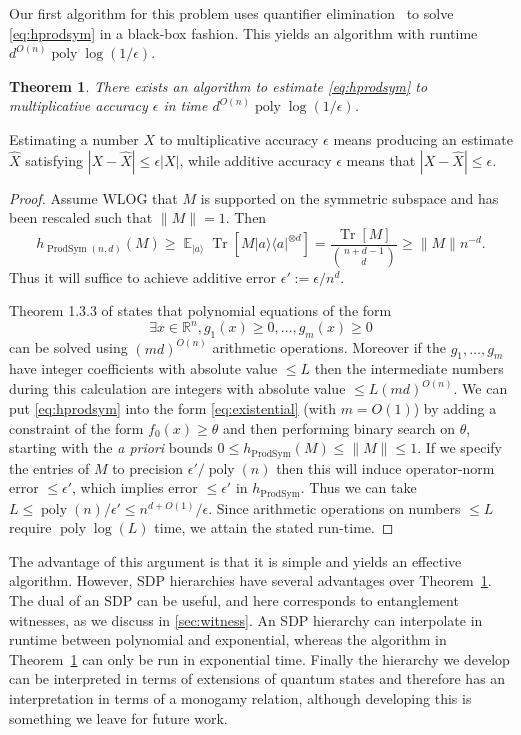 \documentclass[aps,pra,notitlepage,preprintnumbers,11pt,tightenlines]{revtex4-1}
\newcommand{\bra}[1]{\langle #1 |}
\newcommand{\ket}[1]{| #1 \rangle}
\newcommand{\eps}{\epsilon}
\newcommand{\RR}{\mathbb{R}}
\newcommand{\ot}{\otimes}
\newcommand{\be}{\begin{equation}}
\newcommand{\ee}{\end{equation}}
\newcommand{\proj}[1]{\ket{#1} \bra{#1}}
\DeclareMathOperator{\ProdSym}{ProdSym}
\DeclareMathOperator{\Tr}{Tr}
\DeclareMathOperator{\poly}{poly}
\DeclareMathOperator{\E}{\mathbb{E}}
\newtheorem{theorem}{Theorem}
\newcommand{\thmref}[1]{Theorem~\ref{thm:#1}}
\begin{document}
Our first algorithm for this problem uses quantifier
elimination~\cite{Basu96} to solve \eqref{eq:hprodsym} in a black-box
fashion.  This yields an algorithm with runtime
$d^{O(n)}\poly\log(1/\eps)$.
\begin{theorem}\label{thm:quant-elim}
There exists an algorithm to estimate \eqref{eq:hprodsym} to
multiplicative accuracy $\eps$
in time $d^{O(n)}\poly\log(1/\eps)$.
\end{theorem}
Estimating a number $X$ to multiplicative accuracy $\eps$ means
producing an estimate $\hat X$ satisfying $|X - \hat X| \leq \eps
|X|$, while additive accuracy $\eps$ means that $|X-\hat X| \leq \eps$.

\begin{proof}
Assume WLOG that $M$ is supported on the symmetric subspace and 
has been rescaled such that $\|M\| = 1$.   Then
\be
h_{\ProdSym(n,d)}(M) \geq
\E_{\ket a} \Tr[M \proj{a}^{\ot d}]
= \frac{\Tr[M]}{\binom{n+d-1}{d}}
\geq \|M\| n^{-d}.\ee
Thus it will suffice to achieve additive error $\eps' := \eps/n^d$.

Theorem 1.3.3 of \cite{Basu96} states that polynomial equations of the
form 
\be \exists x\in \RR^n, g_1(x)\geq 0, \ldots, g_m(x)\geq 0
\label{eq:existential}\ee
 can be
solved using $(md)^{O(n)}$ arithmetic operations.   Moreover if the
$g_1,\ldots,g_m$ have integer coefficients with absolute value $\leq
L$ then the intermediate numbers during this calculation are integers
with absolute value $\leq L (md)^{O(n)}$.
We can put \eqref{eq:hprodsym} into the form \eqref{eq:existential} (with $m = O(1)$) by adding a
constraint of the form $f_0(x) \geq \theta$ and then performing binary
search on $\theta$, starting with the {\em a priori} bounds $0 \leq
h_{\ProdSym}(M) \leq \|M\| \leq 1 $.   If we specify the entries of $M$ to
precision $\eps'/ \poly(n)$ then this will induce operator-norm error
$\leq \eps'$, which implies error $\leq \eps'$ in $h_{\ProdSym}$.  Thus
we can take $L \leq \poly(n)/\eps' \leq n^{d+O(1)}/\eps$.  Since
arithmetic operations on numbers $\leq L$ require $\poly\log(L)$ time,
we attain the stated run-time.
\end{proof}


The advantage of this argument is that it is simple and yields an
effective algorithm.  However, SDP hierarchies have several advantages
over \thmref{quant-elim}.  The dual of an SDP can be useful, and here
corresponds to entanglement witnesses, as we discuss in
\ref{sec:witness}.  An SDP hierarchy can interpolate in runtime between
polynomial and exponential, whereas the algorithm in
\thmref{quant-elim} can only be run in exponential time.  Finally the
hierarchy we develop can be interpreted in terms of extensions of
quantum states and therefore has an interpretation in terms of a
monogamy relation, although developing this is something we leave for
future work.
\end{document}
